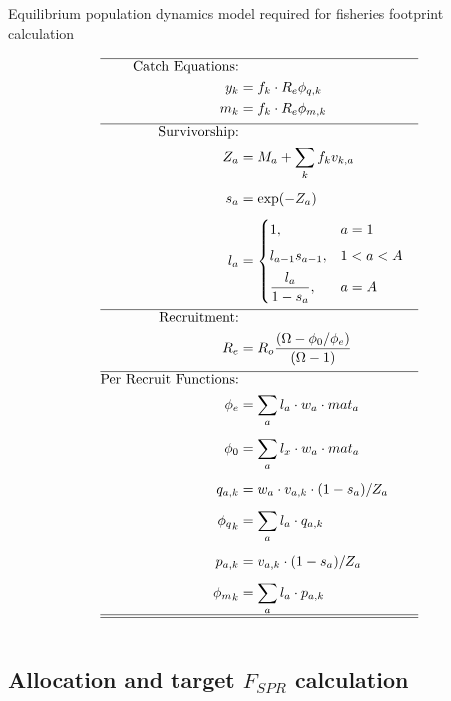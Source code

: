 \documentclass[12pt,letterpaper]{article}
\begin{document}
\begin{table}[h!]
\centering
\caption{Equilibrium population dynamics model required for fisheries footprint calculation}\label{tab:equilibrium_model} 
\tableEq
	\large
    \begin{align}
           \hline
        \mbox{Catch Equations:} \nonumber \\
        	y_{k} &=  f_{k} \cdot R_{e} \phi_{q,k}  \label{T2.1}\\
        	m_{k} &=  f_{k} \cdot R_{e} \phi_{m,k}   \label{T2.2}\\[1ex]
        \hline
        \mbox{Survivorship:} \nonumber \\
        	Z_a &= M_a + \sum_k f_k v_{k,a} \label{T2.3}\\[1ex]
        	s_a &= \exp(-Z_a) \label{T2.4}\\[1ex]
        	l_a &= \begin{cases}
				1,  & a = 1\\[1ex]
				l_{a-1} s_{a-1}, & 1<a<A\\[1ex]
				\dfrac{l_{a}}{1 - s_{a}}, & a = A
			\end{cases} \label{T2.5}\\[1ex]        	
        \hline
        \mbox{Recruitment:} \nonumber \\
        	R_e &= R_o \frac{(\Omega-\phi_{0}/\phi_{e})}{(\Omega - 1)}\label{T2.6}\\[1ex]   
        \hline
        \mbox{Per Recruit Functions:} \nonumber \\
        	\phi_{e} &= \sum_a l_a \cdot w_a \cdot mat_a\label{T2.7}\\[1ex]
        	\phi_{0} &= \sum_a l_x \cdot w_a \cdot mat_a\label{T2.8}\\[1ex]
        	q_{a,k} &= w_a \cdot v_{a,k} \cdot (1-s_a)/ Z_a \label{T2.9}\\[1ex]
			{\phi_{q}}_{k} &= \sum_a l_a \cdot q_{a,k} \label{T2.10}\\[1ex]
			p_{a,k} &= v_{a,k} \cdot (1-s_a)/ Z_a \label{T2.11}\\[1ex]
			{\phi_{m}}_{k} &= \sum_a l_a \cdot p_{a,k} \label{T2.12}\\       
        \hline \hline \nonumber
    \end{align}
\end{table}





\subsection{Allocation and target $F_{SPR}$ calculation}
\end{document}
